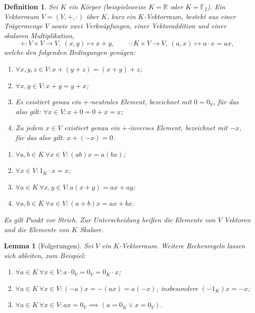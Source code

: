 \documentclass[a4paper]{article}
\theoremstyle{kurzskript}
\newtheorem{definition}[satz]{Definition}
\newtheorem{lemma}[satz]{Lemma}
\newcommand{\R}{\mathbb{R}}
\begin{document}
\begin{definition}
Sei $K$ ein Körper (beispielsweise $K = \R$ oder $K = \mathbb{F}_2$). Ein \emph{Vektorraum} $V = (V, +, \cdot)$ über $K$, kurz ein \emph{$K$-Vektorraum}, besteht aus einer Trägermenge $V$ sowie zwei Verknüpfungen, einer \emph{Vektoraddition} und einer \emph{skalaren Multiplikation},
\[
  +\colon V \times V \to V,\ (x, y) \mapsto x + y, \qquad
  \cdot\colon K \times V \to V,\ (a, x) \mapsto a \cdot x = ax,
\]
welche den folgenden Bedingungen genügen:
\begin{enumerate}[label=(\textup{VA\arabic*}),leftmargin=3.8em]
  \item $\forall x, y, z \in V\colon x + (y + z) = (x + y) + z$;
  \item $\forall x, y \in V\colon x + y = y + x$;
  \item Es existiert genau ein $+$-neutrales Element, bezeichnet mit $0 = 0_V$, für das also gilt: $\forall x \in V\colon x + 0 = 0 + x = x$;
  \item Zu jedem $x \in V$ existiert genau ein $+$-inverses Element, bezeichnet mit $-x$, für das also gilt: $x + (-x) = 0$.
\end{enumerate}
\begin{enumerate}[label=(\textup{SM\arabic*}),leftmargin=3.8em]
  \item $\forall a, b \in K\ \forall x \in V\colon (ab)x = a(bx)$;
  \item $\forall x \in V\colon 1_K \cdot x = x$;
  \item $\forall a \in K\ \forall x, y \in V\colon a(x + y) = ax + ay$;
  \item $\forall a, b \in K\ \forall x \in V\colon (a + b)x = ax + bx$.
\end{enumerate}
Es gilt \glqq Punkt vor Strich\grqq. Zur Unterscheidung heißen die Elemente von $V$ \emph{Vektoren} und die Elemente von $K$ \emph{Skalare}.
\end{definition}

\begin{lemma}[Folgerungen]\label{lem:vr-folgerungen}
Sei $V$ ein $K$-Vektorraum. Weitere Rechenregeln lassen sich ableiten, zum Beispiel:
\begin{enumerate}[label=(\alph*)]
  \item $\forall a \in K\ \forall x \in V\colon a \cdot 0_V = 0_V = 0_K \cdot x$;
  \item $\forall a \in K\ \forall x \in V\colon (-a)x = -(ax) = a(-x)$, insbesondere $(-1_K)x = -x$;
  \item $\forall a \in K\ \forall x \in V\colon ax = 0_V \implies (a = 0_K \lor x = 0_V)$.
\end{enumerate}
\end{lemma}
\end{document}
